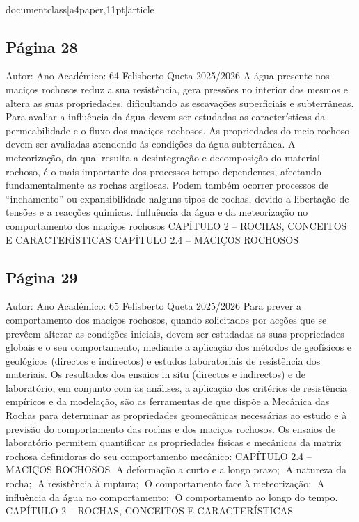 \\documentclass[a4paper,11pt]{article}
\begin{document}
\subsection*{Página 28}
Autor:
Ano Académico:
64
Felisberto Queta
2025/2026
A água presente nos maciços rochosos reduz a sua resistência, gera pressões no interior dos
mesmos e altera as suas propriedades, dificultando as escavações superficiais e subterrâneas. Para
avaliar a influência da água devem ser estudadas as características da permeabilidade e o fluxo dos
maciços rochosos.
As propriedades do meio rochoso devem ser avaliadas atendendo ás condições da água subterrânea.
A meteorização, da qual resulta a desintegração e decomposição do material rochoso, é o mais
importante dos processos tempo-dependentes, afectando fundamentalmente as rochas argilosas.
Podem também ocorrer processos de “inchamento” ou expansibilidade nalguns tipos de rochas,
devido a libertação de tensões e a reacções químicas.
Influência da água e da meteorização no comportamento dos maciços rochosos
CAPÍTULO 2 – ROCHAS, CONCEITOS E CARACTERÍSTICAS
CAPÍTULO 2.4 – MACIÇOS ROCHOSOS 



\subsection*{Página 29}
Autor:
Ano Académico:
65
Felisberto Queta
2025/2026
Para prever a comportamento dos maciços rochosos, quando solicitados por acções que se 
prevêem alterar as condições iniciais, devem ser estudadas as suas propriedades globais e o seu 
comportamento, mediante a aplicação dos métodos de geofísicos e geológicos (directos e 
indirectos) e estudos laboratoriais de resistência dos materiais.
Os resultados dos ensaios in situ (directos e indirectos) e de laboratório, em conjunto com as 
análises, a aplicação dos critérios de resistência empíricos e da modelação, são as ferramentas de 
que dispõe a Mecânica das Rochas para determinar as propriedades geomecânicas necessárias ao 
estudo e à previsão do comportamento das rochas e dos maciços rochosos.
Os ensaios de laboratório permitem quantificar as propriedades físicas e mecânicas da
matriz rochosa definidoras do seu comportamento mecânico:
CAPÍTULO 2.4 – MACIÇOS ROCHOSOS 
A deformação a curto e a longo prazo;
A natureza da rocha;
A resistência à ruptura;
O comportamento face à meteorização;
A influência da água no comportamento;
O comportamento ao longo do tempo.
CAPÍTULO 2 – ROCHAS, CONCEITOS E CARACTERÍSTICAS
\end{document}
